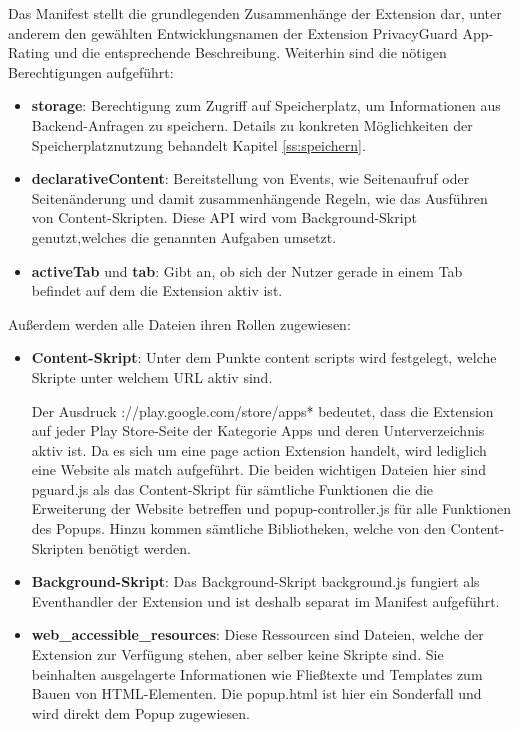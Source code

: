

Das Manifest stellt die grundlegenden Zusammenhänge der Extension dar, unter anderem den gewählten Entwicklungsnamen der Extension \glqq PrivacyGuard App-Rating\grqq{} und die entsprechende Beschreibung.
Weiterhin sind die nötigen Berechtigungen aufgeführt:

\begin{itemize}
	\item \textbf{storage}:
	Berechtigung zum Zugriff auf Speicherplatz, um Informationen aus Backend-Anfragen zu speichern. Details zu konkreten Möglichkeiten der Speicherplatznutzung behandelt Kapitel \ref{ss:speichern}.
	\item \textbf{declarativeContent}:
	Bereitstellung von Events, wie Seitenaufruf oder Seitenänderung und damit zusammenhängende Regeln, wie das Ausführen von Content-Skripten. Diese API wird vom Background-Skript genutzt,welches die genannten Aufgaben umsetzt.
	\item \textbf{activeTab} und \textbf{tab}:
	Gibt an, ob sich der Nutzer gerade in einem Tab befindet auf dem die Extension aktiv ist.
\end{itemize}

Außerdem werden alle Dateien ihren Rollen zugewiesen:

\begin{itemize}
	\item \textbf{Content-Skript}:
	Unter dem Punkte \glqq content scripts \grqq{} wird festgelegt, welche Skripte unter welchem URL aktiv sind.
	
	Der Ausdruck \glqq *://play.google.com/store/apps*\grqq{}
	bedeutet, dass die Extension auf jeder Play Store-Seite der Kategorie Apps und deren Unterverzeichnis aktiv ist. Da es sich um eine \glqq page action\grqq{} Extension handelt, wird lediglich eine Website als \glqq match \grqq{} aufgeführt. Die beiden wichtigen Dateien hier sind \glqq pguard.js\grqq{} als das Content-Skript für sämtliche Funktionen die die Erweiterung der Website betreffen und \glqq popup-controller.js\grqq{} für alle Funktionen des Popups. Hinzu kommen sämtliche Bibliotheken, welche von den Content-Skripten benötigt werden.
	
	\item \textbf{Background-Skript}:
	Das Background-Skript \glqq background.js\grqq{} fungiert als Eventhandler der Extension und ist deshalb separat im Manifest aufgeführt.
	
	\item \textbf{web\_accessible\_resources}:
	Diese Ressourcen sind Dateien, welche der Extension zur Verfügung stehen, aber selber keine Skripte sind. Sie beinhalten ausgelagerte Informationen wie Fließtexte und Templates zum Bauen von HTML-Elementen. Die \glqq popup.html\grqq{} ist hier ein Sonderfall und wird direkt dem Popup zugewiesen.
\end{itemize}

